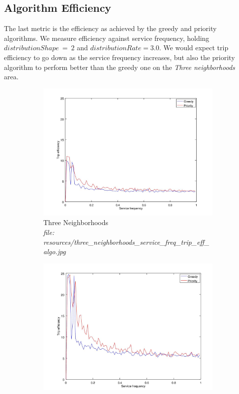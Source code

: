 \documentclass{article}
\begin{document}
		\subsection{Algorithm Efficiency} \label{algocomp}
		The last metric is the efficiency as achieved by the greedy and priority algorithms. We measure efficiency
		against service frequency, holding $distributionShape\ =\ 2$ and  $distributionRate = 3.0$. We would expect 
		trip efficiency to go down as the service frequency increases, but also the priority algorithm to perform better
		than the greedy one on the \textit{Three neighborhoods} area.

		\begin{figure}[H]
			\centering
			\begin{subfigure}[b]{.5\textwidth}
				\includegraphics[width=\textwidth]{resources/three_neighborhoods_service_freq_trip_eff_algo.jpg}
				\caption{Three Neighborhoods \\\textit{file: resources/three\_neighborhoods\_service\_freq\_trip\_eff\_algo.jpg}}
				\label{fig:fig9a}
			\end{subfigure}\hfill%
			\begin{subfigure}[b]{.5\textwidth}
				\includegraphics[width=\textwidth]{resources/big_cluster_service_freq_trip_eff_algo.jpg}

\end{subfigure}
\end{figure}
\end{document}
